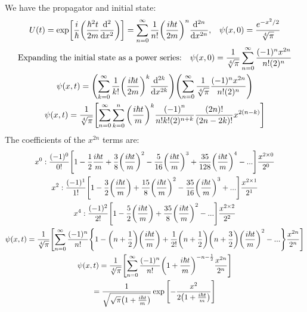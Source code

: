 \documentclass{report}
\theoremstyle{definition}
\begin{document}
\begin{chapter5}\label{prob: 3}
	We have the propagator and initial state:
		\begin{gather*}
			U(t) = \exp[\frac{i}{\hbar}\pqty{\frac{\hbar^2 t}{2m}\dv[2]{x}}] = \sum_{n=0}^{\infty} \frac{1}{n!}\pqty{\frac{i\hbar t}{2m}}^n \dv[2n]{x}, \;\;\; \psi(x,0) = \frac{e^{-x^2/2}}{\sqrt[4]\pi} \\
			\qq*{Expanding the initial state as a power series:}\psi(x,0) = \frac{1}{\sqrt[4]\pi} \sum_{n=0}^{\infty} \frac{(-1)^n x^{2n}}{n!(2)^n} \\
			\psi(x,t) = \pqty{\sum_{k=0}^{\infty} \frac{1}{k!}\pqty{\frac{i\hbar t}{2m}}^k \dv[2k]{x}}\pqty{\sum_{n=0}^{\infty}\frac{1}{\sqrt[4]\pi}\frac{(-1)^n x^{2n}}{n!(2)^n}} \\
			\psi(x,t) = \frac{1}{\sqrt[4]\pi}\bqty{\sum_{n=0}^{\infty}\sum_{k=0}^{n}\pqty{\frac{i\hbar t}{m}}^k\frac{\pqty{-1}^n}{n!k! (2)^{n+k}}\frac{\pqty{2n}!}{\pqty{2n-2k}!}x^{2(n-k)}}
		\end{gather*}
		The coefficients of the $x^{2n}$ terms are:
		\begin{gather*}
			x^0: \frac{(-1)^0}{0!}\bqty{1 - \frac{1}{2}\frac{i\hbar t}{m} + \frac{3}{8}\pqty{\frac{i \hbar t}{m}}^2 - \frac{5}{16}\pqty{\frac{i \hbar t}{m}}^3 + \frac{35}{128}\pqty{\frac{i \hbar t}{m}}^4 - ...}\frac{x^{2\times 0}}{2^0} \\
			x^2: \frac{(-1)^1}{1!}\bqty{1 - \frac{3}{2}\pqty{\frac{i \hbar t}{m}} + \frac{15}{8}\pqty{\frac{i \hbar t}{m}}^2 - \frac{35}{16}\pqty{\frac{i \hbar t}{m}}^3 + ...}\frac{x^{2 \times 1}}{2^1} \\
			x^4: \frac{(-1)^2}{2!}\bqty{1-\frac{5}{2}\pqty{\frac{i \hbar t}{m}} + \frac{35}{8}\pqty{\frac{i \hbar t}{m}}^2 - ...}\frac{x^{2 \times 2}}{2^2} \\
			\psi(x,t) = \frac{1}{\sqrt[4]{\pi}} \bqty{\sum_{n = 0}^{\infty} \frac{(-1)^n}{n!}\Bqty{1 - \pqty{n + \frac{1}{2}}\pqty{\frac{i \hbar t}{m}} + \frac{1}{2!}\pqty{n + \frac{1}{2}}\pqty{n + \frac{3}{2}}\pqty{\frac{i \hbar t}{m}}^2 - ...}\frac{x^{2n}}{2^n}} \\
			\psi(x,t) = \frac{1}{\sqrt[4]\pi} \bqty{\sum_{n = 0}^{\infty} \frac{(-1)^n}{n!}\pqty{1 + \frac{i \hbar t}{m}}^{-n-\frac{1}{2}} \frac{x^{2n}}{2^n}} \\ = \frac{1}{\sqrt{\sqrt{\pi}\pqty{1 + \frac{i \hbar t}{m}}}} \exp\bqty{-\frac{x^2}{2\pqty{1 + \frac{i \hbar t}{m}}}}
		\end{gather*}
\end{chapter5}

\begin{chapter5}\label{prob: 4}
	
\end{chapter5}
\end{document}
